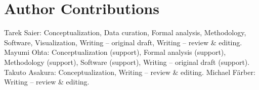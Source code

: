 \section*{Author Contributions}  %
Tarek Saier: Conceptualization, Data curation, Formal analysis, Methodology, Software, Visualization, Writing -- original draft, Writing -- review \& editing. Mayumi Ohta: Conceptualization (support), Formal analysis (support), Methodology (support), Software (support), Writing -- original draft (support). Takuto Asakura: Conceptualization, Writing -- review \& editing. Michael F{\"a}rber: Writing -- review \& editing.
